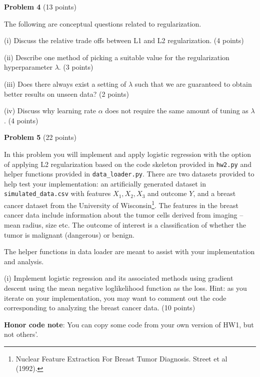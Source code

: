 \documentclass[letterpaper, 11pt]{article}
\newcommand{\problemAnswer}[1]{%
	\noindent\framebox[0.95\columnwidth][c]{\begin{minipage}{0.92\columnwidth}\color{blue}{#1}\end{minipage}} %
}
\begin{document}
{\vspace{1em}


{\large\textbf{Problem 4} (13 points)
	
	The following are conceptual questions related to regularization.
	
	(i) Discuss the relative trade offs between L1 and L2 regularization. (4 points)
	
	(ii) Describe one method of picking a suitable value for the regularization hyperparameter $\lambda$. (3 points)
	
	(iii) Does there always exist a setting of $\lambda$ such that we are guaranteed to obtain better results on unseen data? (2 points)
	
	(iv) Discuss why learning rate $\alpha$ does not require the same amount of tuning as $\lambda$. (4 points)


\problemAnswer{
	
	
	\vspace*{150pt}
}



\vspace{1em}
{\large\textbf{Problem 5} (22 points)
	
In this problem you will implement and apply logistic regression with the option of applying L2 regularization based on the code skeleton provided in \texttt{hw2.py} and helper functions  provided in \texttt{data\_loader.py}. There are two datasets provided to help test your implementation: an artificially generated dataset in \texttt{simulated\_data.csv} with features $X_1, X_2, X_3$ and outcome $Y$, and a breast cancer dataset from the University of Wisconsin\footnote{Nuclear Feature Extraction For
	Breast Tumor Diagnosis. Street et al (1992).}. The features in the breast cancer data include  information about the tumor cells derived from imaging -- mean radius, size etc. The outcome of interest is a classification of whether the tumor is malignant (dangerous) or benign.

The helper functions in data loader are meant to assist with your implementation and analysis.

(i) Implement logistic regression and its associated methods using gradient descent using the mean negative loglikelihood function as the loss. Hint: as you iterate on your implementation, you may want to comment out the code corresponding to analyzing the breast cancer data.  (10 points)

\textbf{Honor code note}: You can copy some code from your own version of HW1, but not others'.

}}}
\end{document}
